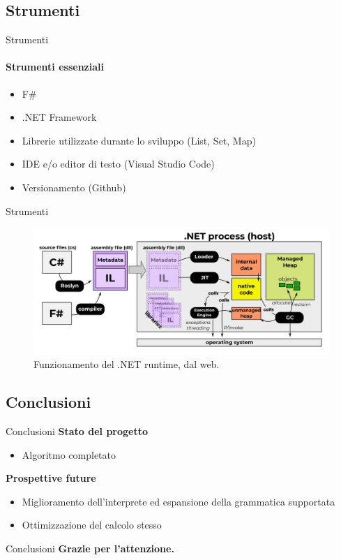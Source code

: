 \documentclass{beamer}
\begin{document}
\begin{darkframes}
    \subsection{Strumenti}
    \begin{frame}{Strumenti}
        \framesubtitle{Strumenti essenziali}
        \begin{itemize}
            \item F\#
            \item .NET Framework
            \item Librerie utilizzate durante lo sviluppo (List, Set, Map)
            \item IDE e/o editor di testo (Visual Studio Code)
            \item Versionamento (Github)
        \end{itemize}
    \end{frame}

    \begin{frame}{Strumenti}
        \begin{figure}[h]
            \caption{Funzionamento del .NET runtime, dal web.}
            \includegraphics[width=\textwidth]{../images/dotnet.png}
        \end{figure}
    \end{frame}

    \subsection{Conclusioni}
    \begin{frame}{Conclusioni}
        \textbf{Stato del progetto}
        \begin{itemize}
            \item Algoritmo completato
        \end{itemize}
        \textbf{Prospettive future}
        \begin{itemize}
            \item Miglioramento dell'interprete ed espansione della grammatica supportata
            \item Ottimizzazione del calcolo stesso
        \end{itemize}
    \end{frame}

    \begin{frame}{Conclusioni}
        \textbf{Grazie per l'attenzione.}
    \end{frame}

\end{darkframes}
\end{document}
